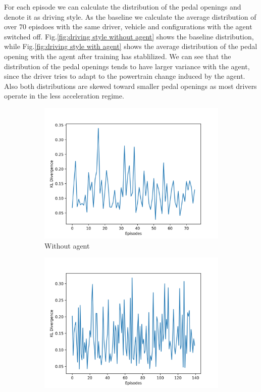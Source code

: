 \documentclass{article}
\begin{document}
For each episode we can calculate the distribution of the pedal openings and denote it as driving style. As the baseline we calculate the average distribution of over 70 episdoes with the same driver, vehicle and configurations with the agent switched off. Fig.\@\ref{fig:driving style without agent} shows the baseline distribution, while Fig.\@\ref{fig:driving style with agent} shows the average distribution of the pedal opening with the agent after training has stablilized. We can see that the distribution of the pedal openings tends to have larger variance with the agent, since the driver tries to adapt to the powertrain change induced by the agent. Also both distributions are skewed toward smaller pedal openings as most drivers operate in the less acceleration regime.

\begin{figure}[htbp]
	\centering
	\begin{subfigure}[t]{0.45\textwidth}
		\centering
		\includegraphics[width=\textwidth]{images/kld.png}
		\caption{Without agent}
		\label{fig:kld episodic style}
	\end{subfigure}
	\hfill
	\begin{subfigure}[t]{0.45\textwidth}
		\centering
		\includegraphics[width=\textwidth]{images/kld-c2.png}

\end{subfigure}
\end{figure}
\end{document}
